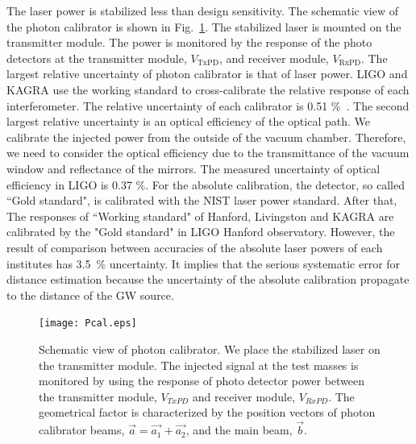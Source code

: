 \documentclass[A4]{spie}  %
\begin{document}
The laser power is stabilized less than design sensitivity. The schematic view of the photon calibrator is shown in Fig.~\ref{fig:Pcal}. The stabilized laser is mounted on the transmitter module. The power is monitored by the response of the photo detectors at the transmitter module, $V_{\mathrm{TxPD}}$, and receiver module, $V_{\mathrm{RxPD}}$.  
The largest relative uncertainty of photon calibrator is that of laser power.
LIGO and KAGRA use the working standard to cross-calibrate the relative response of each interferometer. The relative uncertainty of  each  calibrator is 0.51 \%~\cite{doi:10.1063/1.4967303}. 
The second largest relative uncertainty is an optical efficiency of the optical path. We calibrate the injected power from the outside of the vacuum chamber. Therefore, we need to consider the optical efficiency due to the transmittance of the vacuum window and reflectance of the mirrors. The measured uncertainty of optical efficiency in LIGO is 0.37 \%. 
For the absolute calibration, the detector, so called ``Gold standard", is calibrated with the NIST laser power standard. After that, The responses of ``Working standard" of Hanford, Livingston and KAGRA are calibrated by the "Gold standard" in LIGO Hanford observatory. 
However, the result of comparison between accuracies of the absolute laser powers of each institutes has 3.5~\% uncertainty. It implies that the serious systematic error for distance estimation because the uncertainty of the absolute calibration propagate to the distance of the GW source.

\begin{figure}
\begin{center}
\texttt{[image: Pcal.eps]}
\caption{Schematic view of photon calibrator. We place the stabilized laser on the transmitter module. The injected signal at the test masses is monitored by using the response of photo detector power between the transmitter module, $V_{TxPD}$ and  receiver module, $V_{RxPD}$.  The geometrical factor is characterized by the position vectors of photon calibrator beams, $\vec{a}=\vec{a_1}+\vec{a_2}$, and the main beam, $\vec{b}$.}
\label{fig:Pcal}
\end{center}
\end{figure}
\end{document}

